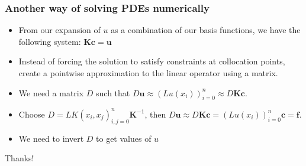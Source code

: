 \documentclass{beamer}
\begin{document}
\begin{frame}
\frametitle{Another way of solving PDEs numerically}
\begin{itemize}
\item From our expansion of $u$ as a combination of our basis functions, we have the following system: $\mathbf{K}\mathbf{c} = \mathbf{u}$
\item Instead of forcing the solution to satisfy constraints at collocation points, create a pointwise approximation to the linear operator using a matrix.
\item We need a matrix $D$ such that $D \mathbf{u} \approx \left( Lu(x_i) \right)_{i=0}^n \approx D \mathbf{K} \mathbf{c} $.
\item Choose $D = LK(x_i, x_j) _{i,j=0}^n \mathbf{K}^{-1}$, then $D\mathbf{u} \approx D\mathbf{K}\mathbf{c} = \left( Lu(x_i) \right)_{i=0}^n \mathbf{c} = \mathbf{f}$. 
\item We need to invert $D$ to get values of $u$
\end{itemize}
\end{frame}


\begin{frame}
\Huge{\centerline{Thanks!}}
\end{frame}

\end{document}
